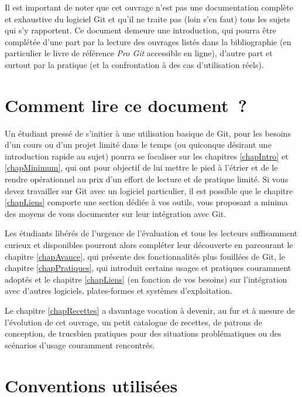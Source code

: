 Il est important de noter que cet ouvrage n'est pas une documentation
complète et exhaustive du logiciel Git et qu'il ne traite pas (loin
s'en faut) tous les sujets qui s'y rapportent. Ce document demeure une
introduction, qui pourra être complétée d'une part par la lecture des
ouvrages listés dans la bibliographie (en particulier le livre de
référence \textit{Pro Git} \cite{ProGit} accessible en ligne), d'autre
part et surtout par la pratique (et la confrontation à des cas
d'utilisation réels).

\section*{Comment lire ce document~?}

Un étudiant pressé de s'initier à une utilisation basique de Git, pour
les besoins d'un cours ou d'un projet limité dans le temps (ou
quiconque désirant une introduction rapide au sujet) pourra se
focaliser sur les chapitres \ref{chapIntro} et \ref{chapMinimum}, qui
ont pour objectif de lui mettre le pied à l'étrier et de le rendre
opérationnel au prix d'un effort de lecture et de pratique limité. Si
vous devez travailler sur Git avec un logiciel particulier, il est
possible que le chapitre \ref{chapLiens} comporte une section dédiée à
vos outils, vous proposant a minima des moyens de vous documenter sur
leur intégration avec Git.

Les étudiants libérés de l'urgence de l'évaluation et tous les
lecteurs suffisamment curieux et disponibles pourront alors compléter
leur découverte en parcourant le chapitre \ref{chapAvance}, qui
présente des fonctionnalités plus fouillées de Git, le chapitre
\ref{chapPratiques}, qui introduit certains usages et pratiques
couramment adoptés et le chapitre \ref{chapLiens} (en fonction de vos
besoins) sur l'intégration avec d'autres logiciels, plates-formes et
systèmes d'exploitation.

Le chapitre \ref{chapRecettes} a davantage vocation à devenir, au fur
et à mesure de l'évolution de cet ouvrage, un petit catalogue de
recettes, de patrons de conception, de \og trucs\fg bien pratiques
pour des situations problématiques ou des scénarios d'usage couramment
rencontrés.

\section*{Conventions utilisées}


